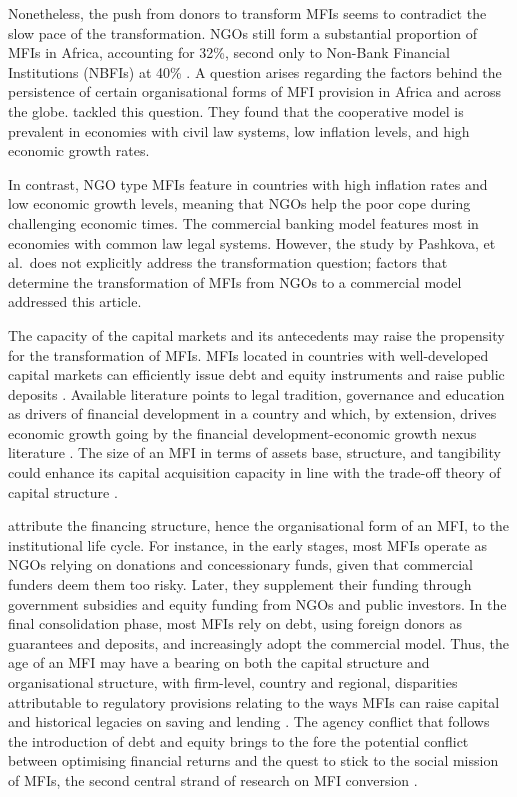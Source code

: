 \documentclass[a4paper, nobind]{templates/ociamthesis}
\begin{document}
Nonetheless, the push from donors to transform MFIs seems to contradict the slow pace of the transformation. NGOs still form a substantial proportion of MFIs in Africa, accounting for 32\%, second only to Non-Bank Financial Institutions (NBFIs) at 40\% \autocite{market2018global}. A question arises regarding the factors behind the persistence of certain organisational forms of MFI provision in Africa and across the globe. \textcite{pashkova2016business} tackled this question. They found that the cooperative model is prevalent in economies with civil law systems, low inflation levels, and high economic growth rates.

In contrast, NGO type MFIs feature in countries with high inflation rates and low economic growth levels, meaning that NGOs help the poor cope during challenging economic times. The commercial banking model features most in economies with common law legal systems. However, the study by Pashkova, et al.~does not explicitly address the transformation question; factors that determine the transformation of MFIs from NGOs to a commercial model addressed this article.

The capacity of the capital markets and its antecedents may raise the propensity for the transformation of MFIs. MFIs located in countries with well-developed capital markets can efficiently issue debt and equity instruments and raise public deposits \autocite{allen2013resolving,allen2014african}. Available literature points to legal tradition, governance and education as drivers of financial development in a country \autocite{rajan1998financial,baltagi2009financial} and which, by extension, drives economic growth going by the financial development-economic growth nexus literature \autocite{claessens2003financial}. The size of an MFI in terms of assets base, structure, and tangibility could enhance its capital acquisition capacity in line with the trade-off theory of capital structure \autocite{barclay2005capital,gwatidzo2009corporate,ojah2016effects}.

\textcite{ledgerwood2006transforming} attribute the financing structure, hence the organisational form of an MFI, to the institutional life cycle. For instance, in the early stages, most MFIs operate as NGOs relying on donations and concessionary funds, given that commercial funders deem them too risky. Later, they supplement their funding through government subsidies and equity funding from NGOs and public investors. In the final consolidation phase, most MFIs rely on debt, using foreign donors as guarantees and deposits, and increasingly adopt the commercial model. Thus, the age of an MFI may have a bearing on both the capital structure and organisational structure, with firm-level, country and regional, disparities attributable to regulatory provisions relating to the ways MFIs can raise capital and historical legacies on saving and lending \autocite{bayai2016financing}. The agency conflict that follows the introduction of debt and equity brings to the fore the potential conflict between optimising financial returns and the quest to stick to the social mission of MFIs, the second central strand of research on MFI conversion \autocite{nurmakhanova2015trade,bayai2016financing,abdulai2017trade,awaworyi2018sustainability}.
\end{document}
